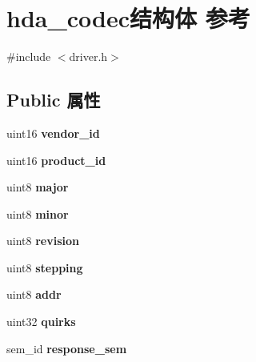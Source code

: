 \hypertarget{structhda__codec}{}\section{hda\+\_\+codec结构体 参考}
\label{structhda__codec}


{\ttfamily \#include $<$driver.\+h$>$}

\subsection*{Public 属性}
\begin{DoxyCompactItemize}
\item 
\mbox{\label{structhda__codec_a95a1f7a56cf2f3f189ee2966cd5f9911}} 
uint16 {\bfseries vendor\+\_\+id}
\item 
\mbox{\label{structhda__codec_a5d3c35f875e912253f9468fd65b7974b}} 
uint16 {\bfseries product\+\_\+id}
\item 
\mbox{\label{structhda__codec_a584f8dc7cb596fd59ba453d2625344fd}} 
uint8 {\bfseries major}
\item 
\mbox{\label{structhda__codec_a4f8b7541241bc8f8cfc7612d5a7d5344}} 
uint8 {\bfseries minor}
\item 
\mbox{\label{structhda__codec_a588719ff2a83acbf6b8c07583326eeb2}} 
uint8 {\bfseries revision}
\item 
\mbox{\label{structhda__codec_ae4ed0492e5de683ad6f4bba29a0bbfaa}} 
uint8 {\bfseries stepping}
\item 
\mbox{\label{structhda__codec_a425a34c47416beb439b5eec8ffee4145}} 
uint8 {\bfseries addr}
\item 
\mbox{\label{structhda__codec_aab8010938b6224baba069215366e90c7}} 
uint32 {\bfseries quirks}
\item 
\mbox{\label{structhda__codec_a959bc9256dcae0beb9caf47bc91f2d11}} 
sem\+\_\+id {\bfseries response\+\_\+sem}
\item 
\mbox{\label{structhda__codec_a715fbedd5c0609c078681510fa97b594}} 

\end{DoxyCompactItemize}
